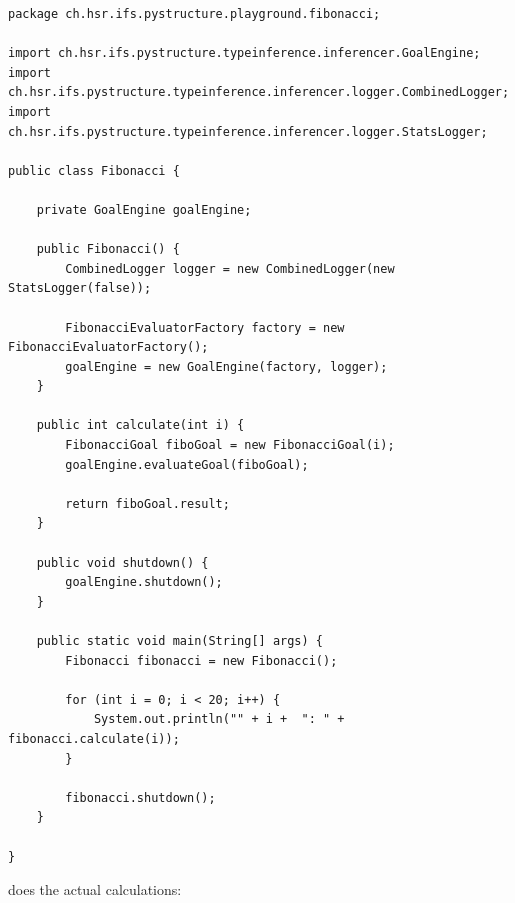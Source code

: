 \documentclass[12pt,halfparskip,DIV11,BCOR10mm]{scrreprt}
\begin{document}
\begin{lstlisting}[style=smalljava]
package ch.hsr.ifs.pystructure.playground.fibonacci;

import ch.hsr.ifs.pystructure.typeinference.inferencer.GoalEngine;
import ch.hsr.ifs.pystructure.typeinference.inferencer.logger.CombinedLogger;
import ch.hsr.ifs.pystructure.typeinference.inferencer.logger.StatsLogger;

public class Fibonacci {
	
	private GoalEngine goalEngine;
	
	public Fibonacci() {
		CombinedLogger logger = new CombinedLogger(new StatsLogger(false));
		
		FibonacciEvaluatorFactory factory = new FibonacciEvaluatorFactory();
		goalEngine = new GoalEngine(factory, logger);
	}

	public int calculate(int i) {
		FibonacciGoal fiboGoal = new FibonacciGoal(i);
		goalEngine.evaluateGoal(fiboGoal);
		
		return fiboGoal.result;
	}
	
	public void shutdown() {
		goalEngine.shutdown();
	}
	
	public static void main(String[] args) {
		Fibonacci fibonacci = new Fibonacci();
		
		for (int i = 0; i < 20; i++) {
			System.out.println("" + i +  ": " + fibonacci.calculate(i));
		}
		
		fibonacci.shutdown();
	}

}
\end{lstlisting}

 does the actual calculations:
\end{document}
